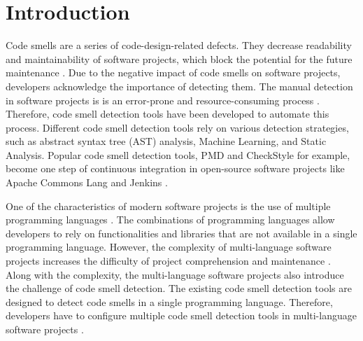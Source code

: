 \section{Introduction}
\label{sec:introduction}

%



Code smells are a series of code-design-related defects. They decrease
readability \cite{5741260} and maintainability \cite{6392174} \cite{6405287} of software projects,
which block the potential for the future maintenance \cite{Fowler_Beck}. Due to the negative impact of code smells on software projects,
developers acknowledge the importance of detecting them. The manual detection in
software projects is is an error-prone and resource-consuming process \cite{DetectingDefectsInObject}. 
Therefore, code smell detection tools have been developed to automate this process.
Different code smell detection tools rely on various detection strategies,
such as abstract syntax tree (AST) analysis, Machine Learning, and Static Analysis.
Popular code smell detection tools, PMD \cite{PMD} and CheckStyle \cite{CheckStyle} for example,
become one step of continuous integration in open-source software projects like Apache Commons Lang \cite{ApacheCommonsLang} and Jenkins \cite{Jekins}.

One of the characteristics of modern software projects is the use of multiple programming languages \cite{723183}. The combinations of
programming languages allow developers to rely on functionalities and libraries that are not available in a single programming language.
However, the complexity of multi-language software projects increases the difficulty of project comprehension and maintenance \cite{7476675, 10.1109/SCAM.2012.11, 7396422}.
Along with the complexity, the multi-language software projects also introduce the challenge of code smell detection. 
The existing code smell detection tools are designed to detect code smells in a single programming language. Therefore, developers have to configure multiple 
code smell detection tools in multi-language software projects \cite{Jekins}.

